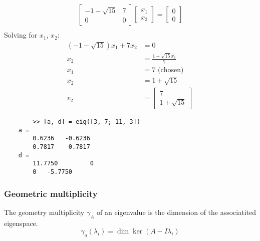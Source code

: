 \begin{example}
    \begin{align*}
        \begin{bmatrix}
            -1  - \sqrt{15} & 7 \\
            0               & 0
        \end{bmatrix} \begin{bmatrix}
            x_1 \\ x_2
        \end{bmatrix} = \begin{bmatrix}
            0 \\ 0
        \end{bmatrix} \\
    \end{align*}
    Solving for $x_1$, $x_2$:
    \begin{align*}
        (-1-\sqrt{15}) x_1 + 7 x_2 & = 0                          \\
        x_2                        & = \frac{1 + \sqrt{15}x_1}{7} \\
        x_1                        & = 7  \text{ (chosen)}        \\
        x_2                        & = 1 + \sqrt{15}              \\
        v_2                        & = \begin{bmatrix}
            7 \\ 1 + \sqrt{15}
        \end{bmatrix}
    \end{align*}
\end{example}
\begin{matlab}
    \begin{lstlisting}
        >> [a, d] = eig([3, 7; 11, 3])
    a =
        0.6236   -0.6236
        0.7817    0.7817
    d =
        11.7750         0
        0   -5.7750
    \end{lstlisting}
\end{matlab}
\subsubsection{Geometric multiplicity}
The geometry multiplicity \(\gamma_A \) of an eigenvalue is the dimension of the associatited eigenspace.
\begin{equation}
    \gamma_a(\lambda_i) = \dim \ker\left(A - I \lambda_i \right)
\end{equation}

